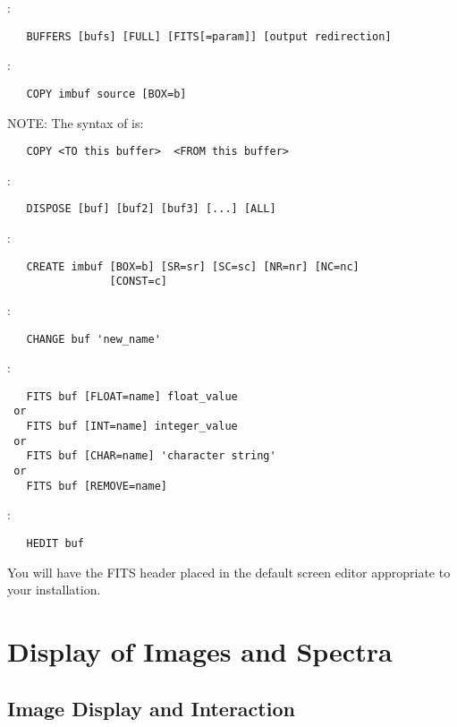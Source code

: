 :
\begin{verbatim}
   BUFFERS [bufs] [FULL] [FITS[=param]] [output redirection]
\end{verbatim}

\noindent {}:
\begin{verbatim}
   COPY imbuf source [BOX=b]
\end{verbatim}
NOTE:  The syntax of  is:
\begin{verbatim}
   COPY <TO this buffer>  <FROM this buffer>
\end{verbatim}

\noindent {}:
\begin{verbatim}
   DISPOSE [buf] [buf2] [buf3] [...] [ALL]
\end{verbatim}

\noindent {}:
\begin{verbatim}
   CREATE imbuf [BOX=b] [SR=sr] [SC=sc] [NR=nr] [NC=nc]
                [CONST=c]
\end{verbatim}

\noindent {}:
\begin{verbatim}
   CHANGE buf 'new_name'
\end{verbatim}

\noindent {}:
\begin{verbatim}
   FITS buf [FLOAT=name] float_value
 or
   FITS buf [INT=name] integer_value
 or
   FITS buf [CHAR=name] 'character string'
 or
   FITS buf [REMOVE=name]
\end{verbatim}

\noindent {}:
\begin{verbatim}
   HEDIT buf
\end{verbatim}
You will have the FITS header placed in the default screen editor appropriate
to your installation.


\section{Display of Images and Spectra}

\subsection{Image Display and Interaction}

